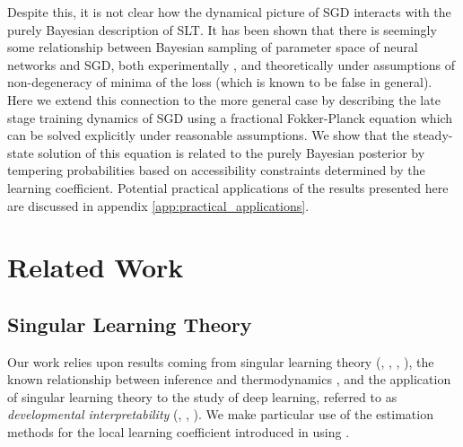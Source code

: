 \documentclass{article} %
\theoremstyle{definition}
\begin{document}
Despite this, it is not clear how the dynamical picture of SGD interacts with the purely Bayesian description of SLT. It has been shown that there is seemingly some relationship between Bayesian sampling of parameter space of neural networks and SGD, both experimentally \citep{mingard2020sgdbayesiansamplerwell}, and theoretically under assumptions of non-degeneracy of minima of the loss \citep{mandt2016variationalanalysisstochasticgradient} (which is known to be false in general). Here we extend this connection to the more general case by describing the late stage training dynamics of SGD using a fractional Fokker-Planck equation which can be solved explicitly under reasonable assumptions. We show that the steady-state solution of this equation is related to the purely Bayesian posterior by tempering probabilities based on accessibility constraints determined by the learning coefficient. Potential practical applications of the results presented here are discussed in appendix \ref{app:practical_applications}.


\section{Related Work}
\subsection{Singular Learning Theory}
Our work relies upon results coming from singular learning theory (\citep{watanabe2012widelyapplicablebayesianinformation}, \citep{watanabe2022recentadvancesalgebraicgeometry}, \citep{watanabe2024reviewprospectalgebraicresearch}, \citep{Watanabe2009AlgebraicGA}), the known relationship between inference and thermodynamics \citep{LaMont_2019}, and the application of singular learning theory to the study of deep learning, referred to as \textit{developmental interpretability} (\citep{wang2024differentiationspecializationattentionheads}, \citep{wang2024loss}, \citep{chen2023dynamicalversusbayesianphase}). We make particular use of the estimation methods for the local learning coefficient introduced in \citep{lau2024locallearningcoefficientsingularityaware} using \citep{devinterpcode}. 
\end{document}
